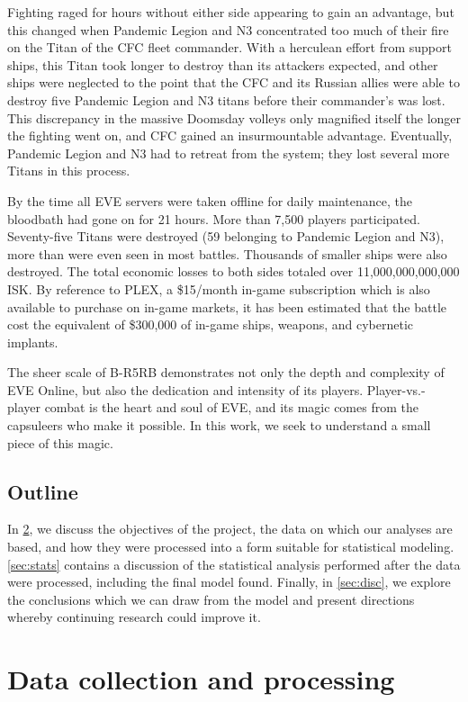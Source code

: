 \documentclass[letterpaper,12pt,article]{memoir}
\begin{document}
Fighting raged for hours without either side appearing to gain an advantage, but
this changed when Pandemic Legion and N3 concentrated too much of their fire on
the Titan of the CFC fleet commander. With a herculean effort from support 
ships, this Titan took longer to destroy than its attackers expected, and other
ships were neglected to the point that the CFC and its Russian allies were able
to destroy five Pandemic Legion and N3 titans before their commander's was
lost. This discrepancy in the massive Doomsday volleys only magnified itself the
longer the fighting went on, and CFC gained an insurmountable advantage. 
Eventually, Pandemic Legion and N3 had to retreat from the system; they lost
several more Titans in this process.

By the time all EVE servers were taken offline for daily maintenance, the 
bloodbath had gone on for 21 hours. More than 7,500 players participated.
Seventy-five Titans were destroyed (59 belonging to Pandemic Legion and N3), 
more than were even seen in most battles. Thousands of smaller ships were also
destroyed. The total economic losses to both sides totaled over 
11,000,000,000,000 ISK. By reference to PLEX, a \$15/month in-game
subscription which is also available to purchase on in-game markets, it has
been estimated that the battle cost the equivalent of \$300,000 of in-game
ships, weapons, and cybernetic implants. 

The sheer scale of B-R5RB demonstrates not only the depth and complexity of
EVE Online, but also the dedication and intensity of its players. Player-vs.-
player combat is the heart and soul of EVE, and its magic comes from the 
capsuleers who make it possible. In this work, we seek to understand a small
piece of this magic.


\section{Outline}
\label{subsec:outline}

In \cref{sec:data}, we discuss the objectives of the project, the data on which
our analyses are based, and how they were processed into a form suitable for
statistical modeling. \cref{sec:stats} contains a discussion of the statistical
analysis performed after the data were processed, including the final model found. 
Finally, in \cref{sec:disc}, we explore the conclusions which we can draw from
the model and present directions whereby continuing research could improve it.

\clearpage
\chapter{Data collection and processing}
\label{sec:data}
\end{document}
